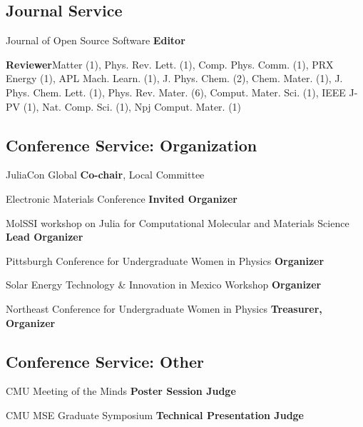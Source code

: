 \subsection{Journal Service}

{Journal of Open Source Software}
{\textbf{Editor}}
{}

{}
                     {\textbf{Reviewer}}{Matter (1), Phys. Rev. Lett. (1), Comp. Phys. Comm. (1), PRX Energy (1), APL Mach. Learn. (1), J. Phys. Chem. (2), Chem. Mater. (1), J. Phys. Chem. Lett. (1), Phys. Rev.  Mater. (6), Comput. Mater. Sci. (1), IEEE J-PV (1), Nat. Comp. Sci. (1), Npj Comput. Mater. (1)}

\vspace{-3mm}
\subsection{Conference Service: Organization}
                      {JuliaCon Global}
                      {\textbf{Co-chair}, Local Committee}
                        {}

{Electronic Materials Conference}
{\textbf{Invited Organizer}}
{}

{MolSSI workshop on Julia for Computational Molecular and Materials Science}
{\textbf{Lead Organizer}}
{}

{Pittsburgh Conference for Undergraduate Women in Physics}
{\textbf{Organizer}}
{}

{Solar Energy Technology \& Innovation in Mexico Workshop}
{\textbf{Organizer}}
{}

{Northeast Conference for Undergraduate Women in Physics}
{\textbf{Treasurer, Organizer}}
{}

\vspace{-2mm}
\subsection{Conference Service: Other}

{CMU Meeting of the Minds}
{\textbf{Poster Session Judge}}
{}


{CMU MSE Graduate Symposium}
{\textbf{Technical Presentation Judge}}
{}

